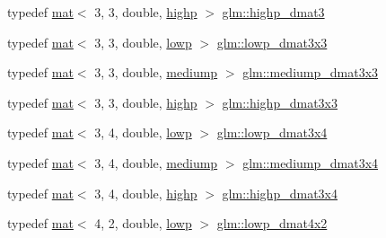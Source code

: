 \begin{DoxyCompactItemize}
typedef \mbox{\hyperlink{structglm_1_1mat}{mat}}$<$ 3, 3, double, \mbox{\hyperlink{namespaceglm_a36ed105b07c7746804d7fdc7cc90ff25ac6f7eab42eacbb10d59a58e95e362074}{highp}} $>$ \mbox{\hyperlink{group__core__precision_ga2e305d56d01a4553a7fd2b6d2c580fa0}{glm\+::highp\+\_\+dmat3}}
\item 
typedef \mbox{\hyperlink{structglm_1_1mat}{mat}}$<$ 3, 3, double, \mbox{\hyperlink{namespaceglm_a36ed105b07c7746804d7fdc7cc90ff25ae161af3fc695e696ce3bf69f7332bc2d}{lowp}} $>$ \mbox{\hyperlink{group__core__precision_gacc5689588709eb4ccf582f21cd9af38c}{glm\+::lowp\+\_\+dmat3x3}}
\item 
typedef \mbox{\hyperlink{structglm_1_1mat}{mat}}$<$ 3, 3, double, \mbox{\hyperlink{namespaceglm_a36ed105b07c7746804d7fdc7cc90ff25a6416f3ea0c9025fb21ed50c4d6620482}{mediump}} $>$ \mbox{\hyperlink{group__core__precision_ga8ecaed5443b0aa73bbe8683fcbb04f65}{glm\+::mediump\+\_\+dmat3x3}}
\item 
typedef \mbox{\hyperlink{structglm_1_1mat}{mat}}$<$ 3, 3, double, \mbox{\hyperlink{namespaceglm_a36ed105b07c7746804d7fdc7cc90ff25ac6f7eab42eacbb10d59a58e95e362074}{highp}} $>$ \mbox{\hyperlink{group__core__precision_gae5f677e4437523476511c84a17206ac2}{glm\+::highp\+\_\+dmat3x3}}
\item 
typedef \mbox{\hyperlink{structglm_1_1mat}{mat}}$<$ 3, 4, double, \mbox{\hyperlink{namespaceglm_a36ed105b07c7746804d7fdc7cc90ff25ae161af3fc695e696ce3bf69f7332bc2d}{lowp}} $>$ \mbox{\hyperlink{group__core__precision_ga5a806e50b4cb26784620e98c8c03f03b}{glm\+::lowp\+\_\+dmat3x4}}
\item 
typedef \mbox{\hyperlink{structglm_1_1mat}{mat}}$<$ 3, 4, double, \mbox{\hyperlink{namespaceglm_a36ed105b07c7746804d7fdc7cc90ff25a6416f3ea0c9025fb21ed50c4d6620482}{mediump}} $>$ \mbox{\hyperlink{group__core__precision_ga8e38f500f63f5caed06699264acfb456}{glm\+::mediump\+\_\+dmat3x4}}
\item 
typedef \mbox{\hyperlink{structglm_1_1mat}{mat}}$<$ 3, 4, double, \mbox{\hyperlink{namespaceglm_a36ed105b07c7746804d7fdc7cc90ff25ac6f7eab42eacbb10d59a58e95e362074}{highp}} $>$ \mbox{\hyperlink{group__core__precision_ga21d3883c59ff3949404de6713e86c89e}{glm\+::highp\+\_\+dmat3x4}}
\item 
typedef \mbox{\hyperlink{structglm_1_1mat}{mat}}$<$ 4, 2, double, \mbox{\hyperlink{namespaceglm_a36ed105b07c7746804d7fdc7cc90ff25ae161af3fc695e696ce3bf69f7332bc2d}{lowp}} $>$ \mbox{\hyperlink{group__core__precision_gaa61cd1362e63979d3e17d53957d2e17f}{glm\+::lowp\+\_\+dmat4x2}}
\item 

\end{DoxyCompactItemize}
